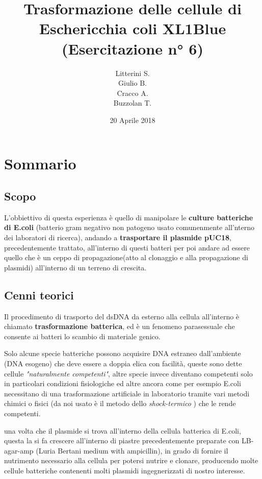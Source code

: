 \documentclass{article}
\title{Trasformazione delle cellule di Eschericchia coli XL1Blue \\ (Esercitazione n° 6)} %
\author{Litterini S. \\Giulio B. \\Cracco A.\\Buzzolan T. } %
\date{20 Aprile 2018} %
\begin{document}
\maketitle 


\section{Sommario}

\subsection{Scopo}


L'obbiettivo di questa esperienza è quello di manipolare le \textbf{culture batteriche di E.coli} (batterio gram negativo non patogeno usato comunenmente all'nterno dei laboratori di ricerca), andando a \textbf{trasportare il plasmide pUC18}, precedentemente trattato, all'interno di questi batteri per poi andare ad essere quello che è un ceppo di propagazione(atto al clonaggio e alla propagazione di plasmidi) all'interno di un terreno di crescita.


\subsection{Cenni teorici}


Il procedimento di trasporto del dsDNA da esterno alla cellula all'interno è chiamato \textbf{trasformazione batterica}, ed è un fenomeno parasessuale che consente ai batteri lo scambio di materiale genico.


Solo alcune specie batteriche possono acquisire DNA estraneo dall'ambiente (DNA esogeno) che deve essere a doppia elica con facilità, queste sono dette cellule \textit{"naturalmente competenti"}, altre specie invece diventano competenti solo in particolari condizioni fisiologiche ed altre ancora come per esempio E.coli  necessitano di una trasformazione artificiale in laboratorio tramite vari metodi chimici o fisici (da noi usato è il metodo dello \textit{shock-termico} ) che le rende competenti.


una volta che il plasmide si trova all'interno della cellula batterica di E.coli, questa la si fa crescere all'interno di piastre precedentemente preparate con LB-agar-amp (Luria Bertani medium with ampicillin), in grado di fornire il nutrimento necessario alla cellula per potersi nutrire e clonare, producendo molte cellule batteriche contenenti molti plasmidi ingegnerizzati di nostro interesse.
\end{document}
